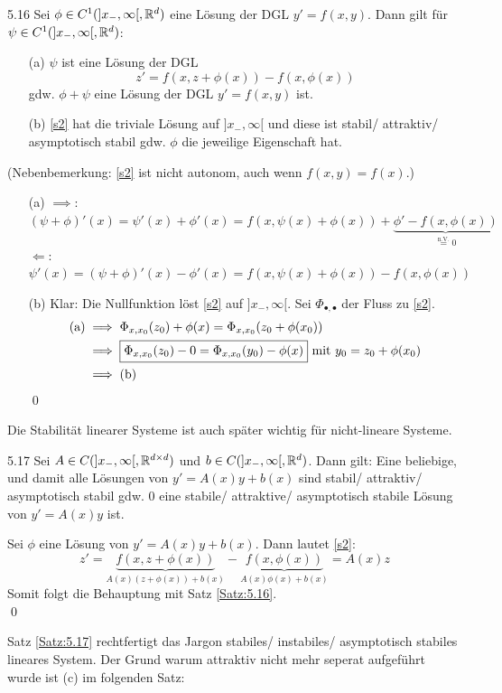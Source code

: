 \documentclass[a4paper]{article}
\begin{document}
\begin{Satz}{}{5.16}
Sei $\phi\in C^1(]x_-,\infty[,\mathbb R^d)$ eine Lösung der DGL $y'=f(x,y)$. Dann gilt für $\psi\in C^1(]x_-,\infty[,\mathbb R^d)$:
\begin{itemize}
\item[(a)] $\psi$ ist eine Lösung der DGL
\[z'=f(x,z+\phi(x))-f(x,\phi(x))\tag{$*$}\label{s2}\]
gdw. $\phi+\psi$ eine Lösung der DGL $y'=f(x,y)$ ist.
\item[(b)] \eqref{s2} hat die triviale Lösung auf $]x_-,\infty[$ und diese ist stabil/ attraktiv/ asymptotisch stabil gdw. $\phi$ die jeweilige Eigenschaft hat.
\end{itemize}
(Nebenbemerkung: \eqref{s2} ist nicht autonom, auch wenn $f(x,y)=f(x)$.)
\end{Satz}

\begin{Beweis}
\begin{itemize}
\item[(a)] \glqq$\implies$\grqq: $(\psi+\phi)'(x)=\psi'(x)+\phi'(x)=f(x,\psi(x)+\phi(x))+\underbrace{\phi'-f(x,\phi(x))}_{\overset{\text{n.V.}}{=}0}$\\
\glqq $\Longleftarrow$\grqq: $\psi'(x)=(\psi+\phi)'(x)-\phi'(x)=f(x,\psi(x)+\phi(x))-f(x,\phi(x))$
\item[(b)] Klar: Die Nullfunktion löst \eqref{s2} auf $]x_-,\infty[$. Sei $\Phi_{\bullet,\bullet}$ der Fluss zu \eqref{s2}.
\begin{align*}
\text{(a)}&\implies \Phi_{x,x_0}(z_0)+\phi(x)=\Phi_{x,x_0}(z_0+\phi(x_0))\\
&\implies \fbox{$\Phi_{x,x_0}(z_0)-0=\Phi_{x,x_0}(y_0)-\phi(x)$}\text{ mit } y_0=z_0+\phi(x_0)\\
&\implies \text{(b)}
\end{align*}\qed
\end{itemize}
\end{Beweis}

Die Stabilität linearer Systeme ist auch später wichtig für nicht-lineare Systeme.
\begin{Satz}{}{5.17}
Sei $A\in C(]x_-,\infty[,\mathbb R^{d\times d})$ und $b\in C(]x_-,\infty[,\mathbb R^d)$. Dann gilt: Eine beliebige, und damit alle Lösungen von $y'=A(x)y+b(x)$ sind stabil/ attraktiv/ asymptotisch stabil gdw. $0$ eine stabile/ attraktive/ asymptotisch stabile Lösung von $y'=A(x)y$ ist.
\end{Satz}

\begin{Beweis}
Sei $\phi$ eine Lösung von $y'=A(x)y+b(x)$. Dann lautet \eqref{s2}:
\[z'=\underbrace{f(x,z+\phi(x))}_{A(x)(z+\phi(x))+b(x)}
-\underbrace{f(x,\phi(x))}_{A(x)\phi(x)+b(x)}
=A(x)z
\]
Somit folgt die Behauptung mit Satz \ref{Satz:5.16}.\\\qed
\end{Beweis}
Satz \ref{Satz:5.17} rechtfertigt das Jargon \glqq stabiles/ instabiles/ asymptotisch stabiles lineares System\grqq. Der Grund warum \glqq attraktiv\grqq{} nicht mehr seperat aufgeführt wurde ist (c) im folgenden Satz:
\end{document}
